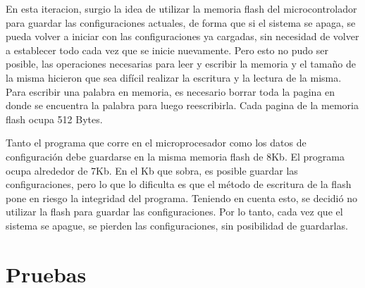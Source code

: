 En esta iteracion, surgio la idea de utilizar la memoria flash del microcontrolador para guardar las configuraciones actuales, de forma que si el sistema se apaga, se pueda volver a iniciar con las configuraciones ya cargadas, sin necesidad de volver a establecer todo cada vez que se inicie nuevamente. Pero esto no pudo ser posible, las operaciones necesarias para leer y escribir la memoria y el tamaño de la misma hicieron que sea difícil realizar la escritura y la lectura de la misma. Para escribir una palabra en memoria, es necesario borrar toda la pagina en donde se encuentra la palabra para luego reescribirla. Cada pagina de la memoria flash ocupa 512 Bytes.

Tanto el programa que corre en el microprocesador como los datos de configuración debe guardarse en la misma memoria flash de 8Kb. El programa ocupa alrededor de 7Kb. En el Kb que sobra, es posible guardar las configuraciones, pero lo que lo dificulta es que el método de escritura de la flash pone en riesgo la integridad del programa. Teniendo en cuenta esto, se decidió no utilizar la flash para guardar las configuraciones. Por lo tanto, cada vez que el sistema se apague, se pierden las configuraciones, sin posibilidad de guardarlas.



\section{Pruebas} %
\label{it5:sec:pruebas}

